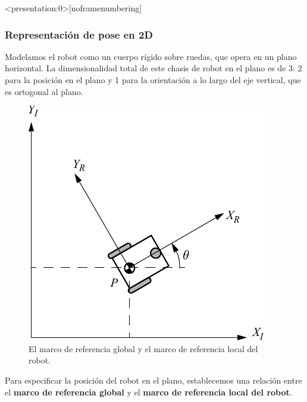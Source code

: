 \begin{frame}<presentation:0>[noframenumbering]
    \frametitle{Representación de pose en 2D}
    \footnotesize
    Modelamos el robot como un cuerpo rígido sobre ruedas, que opera en un plano horizontal. La dimensionalidad total de este chasis de robot en el plano es de 3: 2 para la posición en el plano y 1 para la orientación a lo largo del eje vertical, que es ortogonal al plano.

    \begin{figure}[!h]
        \includegraphics[width=0.2\columnwidth]{./images/coordinate_systems.pdf}
        \caption{El marco de referencia global y el marco de referencia local del robot.}
    \end{figure}

    Para especificar la posición del robot en el plano, establecemos una relación entre el {\bf marco de referencia global} y el {\bf marco de referencia local del robot}.
    
\end{frame}


